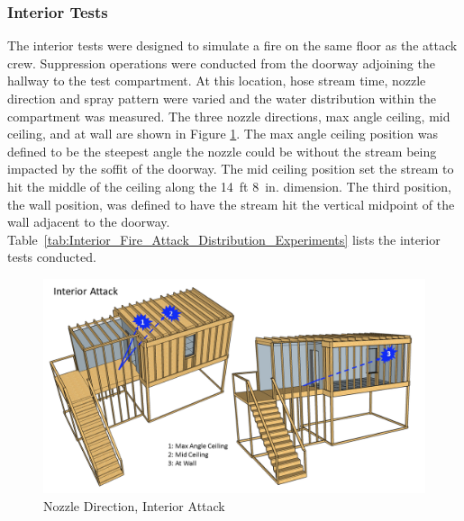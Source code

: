 \documentclass{article}
\begin{document}
\subsubsection{Interior Tests}
\label{int_tests}
The interior tests were designed to simulate a fire on the same floor as the attack crew. Suppression operations were conducted from the doorway adjoining the hallway to the test compartment. At this location, hose stream time, nozzle direction and spray pattern were varied and the water distribution within the compartment was measured. The three nozzle directions, max angle ceiling, mid ceiling, and at wall are shown in Figure \ref{fig:Nozzle_Direction_Interior_Attack}. The max angle ceiling position was defined to be the steepest angle the nozzle could be without the stream being impacted by the soffit of the doorway. The mid ceiling position set the stream to hit the middle of the ceiling along the 14~ft 8~in. dimension. The third position, the wall position, was defined to have the stream hit the vertical midpoint of the wall adjacent to the doorway. Table~\ref{tab:Interior_Fire_Attack_Distribution_Experiments} lists the interior tests conducted.

\begin{figure}[!ht]
	\centering
	\includegraphics[width=\columnwidth]{Figures/Water_Distribution/Nozzle_Position_Int}
	\caption{Nozzle Direction, Interior Attack}
	\label{fig:Nozzle_Direction_Interior_Attack}
\end{figure}
\end{document}
